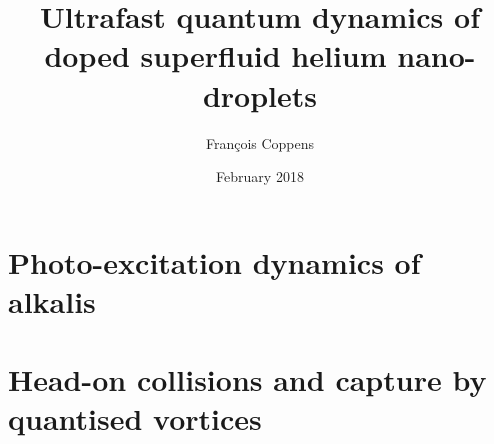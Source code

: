 \documentclass[12pt,a4paper,twosides]{book}
\begin{document}
\frontmatter
	\title{Ultrafast quantum dynamics of doped superfluid helium nano-droplets}
	\author{Fran\c{c}ois Coppens}
	\date{February 2018}
	\maketitle
	\renewcommand{\contentsname}{Table of Contents}
	\tableofcontents

\mainmatter
	
	
	\part{Photo-excitation dynamics of alkalis}
		
		
	\part{Head-on collisions and capture by quantised vortices}
		
		
	

\backmatter
	
\end{document}
